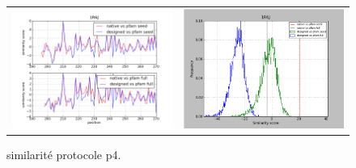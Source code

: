 \documentclass[a4paper,12pt]{article}
\begin{document}
   \begin{figure}[t]
     \centering
     \begin{tabular}{cc}
       \includegraphics[width=8.45cm]{gen_08032012/1R6J/p4/graph_simil_bypos.png} &
       \includegraphics[width=8.45cm]{gen_08032012/1R6J/p4/graph_simil_byseq.png} \\

     \end{tabular}

     \caption{similarité protocole p4.}
   \end{figure}
\end{document}
